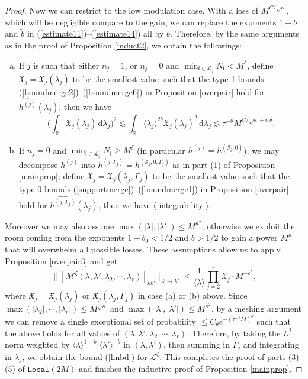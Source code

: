 \documentclass[11 pt,reqno]{amsart}
\theoremstyle{definition}
\theoremstyle{remark}
\numberwithin{equation}{section}
\newcommand{\Sc}{\mathcal{S}}
\newcommand{\Lc}{\mathcal{L}}
\newcommand{\Rb}{\mathbb{R}}
\newcommand{\Xf}{\mathfrak{X}}
\newcommand{\lf}{\mathfrak{l}}
\newcommand{\Ms}{\mathscr{M}}
\newcommand{\Ls}{\mathscr{L}}
\begin{document}
{\begin{proof}
Now we can restrict to the low modulation case. With a loss of $M^{C/\sqrt{\kappa}}$, which will be negligible compare to the gain, we can replace the exponents $1-b$ and $\widetilde{b}$ in (\ref{estimate11})--(\ref{estimate14}) all by $b$. Therefore, by the same arguments as in the proof of Proposition \ref{induct2}, we obtain the followings:
\begin{enumerate}[(a)]
\item If $j$ is such that either $n_j=1$, or $n_j=0$ and $\min_{\lf\in\Lc_j}N_\lf<M^\delta$, define $\Xf_j=\Xf_j(\lambda_j)$ to be the smallest value such that the type 1 bounds (\ref{boundmerge2})--(\ref{boundmerge6}) in Proposition \ref{overpair} hold for $\widehat{h^{(j)}}(\lambda_j)$, then we have
\begin{equation}\label{integrability2}\bigg(\int_\Rb\Xf_j(\lambda_j)\,\mathrm{d}\lambda_j\bigg)^2\lesssim\int_\Rb\langle \lambda_j\rangle^{2b}\Xf_j(\lambda_j)^2\,\mathrm{d}\lambda_j\lesssim\tau^{-\theta}M^{C/\sqrt{\kappa}+C\delta}.
\end{equation}
\item If $n_j=0$ and $\min_{\lf\in\Lc_j}N_\lf\geq M^\delta$ (in particular $h^{(j)}=h^{(\Sc_j,0)}$), we may decompose $h^{(j)}$ into $h^{(j,\Gamma_j)}=h^{(\Sc_j,0,\Gamma_j)}$ as in part (1) of Proposition \ref{mainprop}; define $\Xf_j=\Xf_j(\lambda_j,\Gamma_j)$ to be the smallest value such that the type 0 bounds (\ref{supportmerge})--(\ref{boundmerge1}) in Proposition \ref{overpair} hold for $\widehat{h^{(j,\Gamma_j)}}(\lambda_j)$, then we have (\ref{integrability}).
\end{enumerate}

Moreover we may also assume $\max(|\lambda|,|\lambda'|)\leq M^{\kappa^2}$, otherwise we exploit the room coming from the exponents $1-b_0<1/2$ and $b>1/2$ to gain a power $M^{\kappa}$ that will overwhelm all possible losses. These assumptions allow us to apply Proposition \ref{overpair3} and get
\[\|[\Ms^{\zeta}(\lambda,\lambda',\lambda_2,\cdots,\lambda_r)]_{kk'}\|_{k\to k'}\leq\frac{1}{\langle\lambda\rangle}\prod_{j=2}^r\Xf_j\cdot M^{-\varepsilon^5},\] where $\Xf_j=\Xf_j(\lambda_j)$ or $\Xf_j(\lambda_j,\Gamma_j)$ in case (a) or (b) above. Since $\max(|\lambda_2|,\cdots,|\lambda_r|)\leq M^{\sqrt{\kappa}}$ and $\max(|\lambda|,|\lambda'|)\leq M^{\kappa^2}$, by a meshing argument we can remove a single exceptional set of probability $\leq C_\theta e^{-(\tau^{-1}M)^\theta}$ such that the above holds for all values of $(\lambda,\lambda',\lambda_2,\cdots,\lambda_r)$. Therefore, by taking the $L^2$ norm weighted by $\langle \lambda\rangle^{1-b_0}\langle\lambda'\rangle^{-b}$ in $(\lambda,\lambda')$, then summing in $\Gamma_j$ and integrating in $\lambda_j$, we obtain the bound (\ref{linbd}) for $\Ls^\zeta$. This completes the proof of parts (3)--(5) of $\mathtt{Local}(2M)$ and finishes the inductive proof of Proposition \ref{mainprop}.
\end{proof}
}
\end{document}

